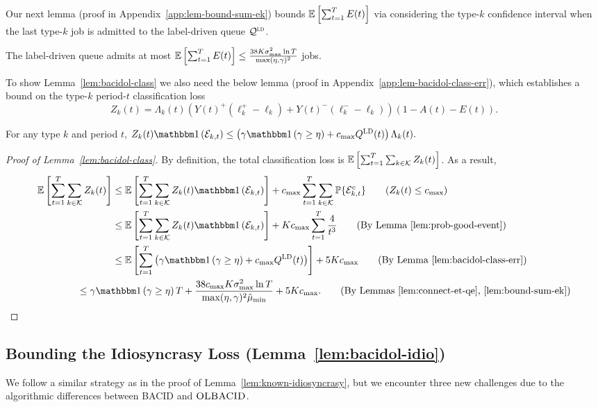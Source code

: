 Our next lemma (proof in Appendix~\ref{app:lem-bound-sum-ek}) bounds $\mathbb E\left[\sum_{t=1}^T E(t)\right]$ via considering the type-$k$ confidence interval when the last type-$k$ job is admitted to the label-driven queue $\mathcal{Q}^{\textsc{ld}}$.
\begin{lemma}\label{lem:bound-sum-ek}
The label-driven queue admits at most
$\mathbb E\left[\sum_{t=1}^T E(t)\right] \leq \frac{38K\sigma^2_{\max}\ln T}{\max(\eta,\gamma)^2}$ jobs.
\end{lemma}

To show Lemma~\ref{lem:bacidol-class} we also need the below lemma (proof in Appendix~\ref{app:lem-bacidol-class-err}), which establishes a bound on the type-$k$ period-$t$ classification loss \[Z_k(t) = \Lambda_k(t)\left(Y(t)^+(\ell_k^{+} - \ell_k) + Y(t)^-(\ell_k^{-}-\ell_k)\right)(1 - A(t) - E(t)).\]

\begin{lemma}\label{lem:bacidol-class-err}
For any type $k$ and period $t$,  $Z_k(t)\indic{\set{E}_{k,t}} \leq \left(\gamma \indic{\gamma \geq \eta} + c_{\max}Q^{\ld}(t)\right)\Lambda_k(t).$
\end{lemma}
\begin{proof}[Proof of Lemma~\ref{lem:bacidol-class}]
By definition, the total classification loss is $\mathbb E\left[\sum_{t=1}^T \sum_{k \in \mathcal{K}} Z_k(t)\right]$. As a result,
\begin{align*}
\expect{\sum_{t=1}^T \sum_{k \in \set{K}} Z_k(t)} &\leq \expect{\sum_{t=1}^T \sum_{k \in \set{K}} Z_k(t)\indic{\set{E}_{k,t}}} + c_{\max}\sum_{t=1}^T \sum_{k \in \set{K}} \Pr\{\set{E}_{k,t}^c\} \tag{$Z_k(t)\leq c_{\max}$}\\
&\leq \expect{\sum_{t=1}^T \sum_{k \in \set{K}} Z_k(t)\indic{\set{E}_{k,t}}} + Kc_{\max}\sum_{t=1}^T \frac{4}{t^3} \tag{By Lemma~\ref{lem:prob-good-event}}\\
&\leq \expect{\sum_{t=1}^T \left(\gamma \indic{\gamma \geq \eta} + c_{\max}Q^{\ld}(t)\right)} + 5Kc_{\max}\tag{By Lemma~\ref{lem:bacidol-class-err}} \\
&\hspace{-0.5in}\leq \gamma \indic{\gamma \geq \eta} T + \frac{38c_{\max}K\sigma^2_{\max}\ln T}{\max(\eta,\gamma)^2\hat{\mu}_{\min}} + 5Kc_{\max}.\tag{By Lemmas~\ref{lem:connect-et-qe},~\ref{lem:bound-sum-ek}}
\end{align*}
\end{proof}

\subsection{Bounding 
the Idiosyncrasy Loss (Lemma~\ref{lem:bacidol-idio})}\label{sec:bacidol-idio}
We follow a similar strategy as in the proof of Lemma~\ref{lem:known-idiosyncrasy}, but we encounter three new challenges due to the algorithmic differences between \textsc{BACID} and $\textsc{OLBACID}$. 


